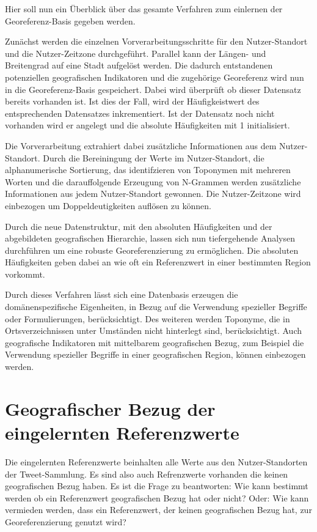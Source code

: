 			Hier soll nun ein Überblick über das gesamte Verfahren zum einlernen der Georeferenz-Basis gegeben werden.
		
			Zunächst werden die einzelnen Vorverarbeitungsschritte für den Nutzer-Standort und die Nutzer-Zeitzone durchgeführt.
			Parallel kann der Längen- und Breitengrad auf eine Stadt aufgelöst werden.
			Die dadurch entstandenen potenziellen geografischen Indikatoren und die zugehörige Georeferenz wird nun in die Georeferenz-Basis gespeichert. 
			Dabei wird überprüft ob dieser Datensatz bereits vorhanden ist. 
			Ist dies der Fall, wird der Häufigkeistwert des entsprechenden Datensatzes inkrementiert.
			Ist der Datensatz noch nicht vorhanden wird er angelegt und die absolute Häufigkeiten mit 1 initialisiert.

			Die Vorverarbeitung extrahiert dabei zusätzliche Informationen aus dem Nutzer-Standort.
			Durch die Bereiningung der Werte im Nutzer-Standort, die alphanumerische Sortierung, das identifzieren von Toponymen mit mehreren Worten und die darauffolgende Erzeugung von N-Grammen werden zusätzliche Informationen aus jedem Nutzer-Standort gewonnen.
			Die Nutzer-Zeitzone wird einbezogen um Doppeldeutigkeiten auflösen zu können.

			Durch die neue Datenstruktur, mit den absoluten Häufigkeiten und der abgebildeten geografischen Hierarchie, lassen sich nun tiefergehende Analysen durchführen um eine robuste Georeferenzierung zu ermöglichen. 
			Die absoluten Häufigkeiten geben dabei an wie oft ein Referenzwert in einer bestimmten Region vorkommt.

			Durch dieses Verfahren lässt sich eine Datenbasis erzeugen die domänenspezifische Eigenheiten, in Bezug auf die Verwendung spezieller Begriffe oder Formulierungen, berücksichtigt.
			Des weiteren werden Toponyme, die in Ortsverzeichnissen unter Umständen nicht hinterlegt sind, berücksichtigt.
			Auch geografische Indikatoren mit mittelbarem geografischen Bezug, zum Beispiel die Verwendung spezieller Begriffe in einer geografischen Region, können einbezogen werden. 

	\section{Geografischer Bezug der eingelernten Referenzwerte}
			
		Die eingelernten Referenzwerte beinhalten alle Werte aus den Nutzer-Standorten der Tweet-Sammlung.
		Es sind also auch Refrenzwerte vorhanden die keinen geografischen Bezug haben.
		Es ist die Frage zu beantworten: Wie kann bestimmt werden ob ein Referenzwert geografischen Bezug hat oder nicht?
		Oder: Wie kann vermieden werden, dass ein Referenzwert, der keinen geografischen Bezug hat, zur Georeferenzierung genutzt wird?
		
